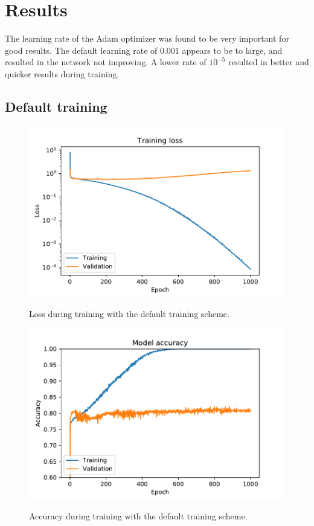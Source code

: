 \documentclass{kththesis}
\begin{document}
\chapter{Results}

The learning rate of the Adam optimizer was found to be very important for good results. The default learning rate of $0.001$ appears to be to large, and resulted in the network not improving. A lower rate of $10^{-5}$ resulted in better and quicker results during training.

\section{Default training}

\begin{figure}
  \centering
  \includegraphics[width=0.9\linewidth]{img/loss_default.pdf}
  \label{fig:loss_default}
  \caption{Loss during training with the default training scheme.}
\end{figure}
\begin{figure}
  \centering
  \includegraphics[width=0.9\linewidth]{img/accuracy_default.pdf}
  \label{fig:accuracy_default}
  \caption{Accuracy during training with the default training scheme.}
\end{figure}
\end{document}
